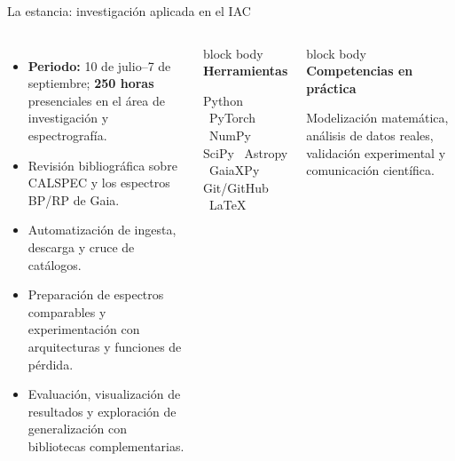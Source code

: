 \documentclass[aspectratio=169,10pt]{beamer}
\begin{document}
\begin{frame}{La estancia: investigación aplicada en el IAC}
  \begin{columns}[T,onlytextwidth]
      \begin{itemize}
        \item \textbf{Periodo:} 10 de julio--7 de septiembre; \textbf{250 horas}
              presenciales en el área de investigación y espectrografía.
        \item Revisión bibliográfica sobre CALSPEC y los espectros BP/RP de Gaia.
        \item Automatización de ingesta, descarga y cruce de catálogos.
        \item Preparación de espectros comparables y experimentación con
              arquitecturas y funciones de pérdida.
        \item Evaluación, visualización de resultados y exploración de
              generalización con bibliotecas complementarias.
      \end{itemize}
      \begin{beamercolorbox}[wd=\linewidth,sep=0.85em,rounded=true]{block body}
        {\color{ULLNavy}\bfseries Herramientas}\par\vspace{0.35em}
        Python \textbullet\ PyTorch \textbullet\ NumPy\\
        SciPy \textbullet\ Astropy \textbullet\ GaiaXPy\\
        Git/GitHub \textbullet\ LaTeX
      \end{beamercolorbox}
      \vspace{0.65em}
      \begin{beamercolorbox}[wd=\linewidth,sep=0.85em,rounded=true]{block body}
        {\color{ULLNavy}\bfseries Competencias en práctica}\par\vspace{0.35em}
        Modelización matemática, análisis de datos reales, validación
        experimental y comunicación científica.
      \end{beamercolorbox}
  \end{columns}
\end{frame}
\end{document}
